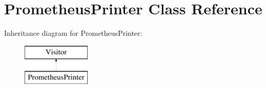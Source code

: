 \section{Prometheus\+Printer Class Reference}
\label{classPrometheusPrinter}
Inheritance diagram for Prometheus\+Printer\+:\begin{figure}[H]
\begin{center}
\leavevmode
\includegraphics[height=2.000000cm]{classPrometheusPrinter}
\end{center}
\end{figure}
